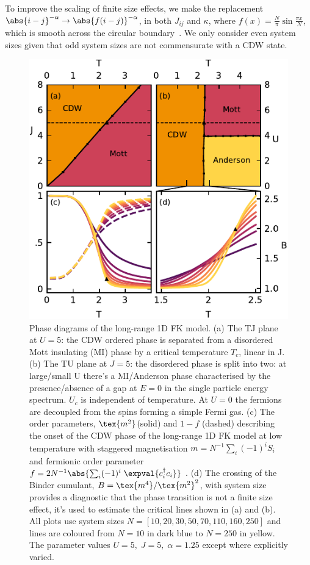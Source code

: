 To improve the scaling of finite size effects, we make the replacement \( \abs{i - j}^{-\alpha} \rightarrow \abs{f(i - j)}^{-\alpha}\), in both \(J_{ij}\) and \(\kappa\), where \(f(x) = \frac{N}{\pi}\sin \frac{\pi x}{N}\), which is smooth across the circular boundary~\cite{fukuiOrderNClusterMonte2009}. We only consider even system sizes given that odd system sizes are not commensurate with a \ac{CDW} state. 

\begin{figure}[!ht]
  \centering
    \includegraphics[width=.5\columnwidth]{figs/FK_paper/phase_diagram}
  \caption{\label{fig:phase_diagram} Phase diagrams of the long-range 1D \ac{FK} model. (a) The TJ plane at \(U = 5\): the \ac{CDW} ordered phase is separated from a disordered Mott insulating (MI) phase by a critical temperature \(T_c\), linear in J. (b) The TU plane at \(J = 5\): the disordered phase is split into two: at large/small U there's a MI/Anderson phase characterised by the presence/absence of a gap at \(E=0\) in the single particle energy spectrum. \(U_c\) is independent of temperature. At \(U = 0\) the fermions are decoupled from the spins forming a simple Fermi gas. (c) The order parameters, \(\tex{m^2}\)(solid) and \(1 - f\) (dashed) describing the onset of the \ac{CDW} phase of the long-range 1D \ac{FK} model at low temperature with staggered magnetisation \(m = N^{-1} \sum_i (-1)^i S_i\) and fermionic order parameter \(f = 2 N^{-1}\abs{\sum_i (-1)^i \; \expval{c^\dag_{i}c_{i}}}\) . (d) The crossing of the Binder cumulant, \(B = \tex{m^4} / \tex{m^2}^2\), with system size provides a diagnostic that the phase transition is not a finite size effect, it's used to estimate the critical lines shown in (a) and (b). All plots use system sizes \(N = [10,20,30,50,70,110,160,250]\) and lines are coloured from \(N = 10\) in dark blue to \(N = 250\) in yellow. The parameter values \(U = 5,\;J = 5,\;\alpha = 1.25\) except where explicitly varied.}
\end{figure}

